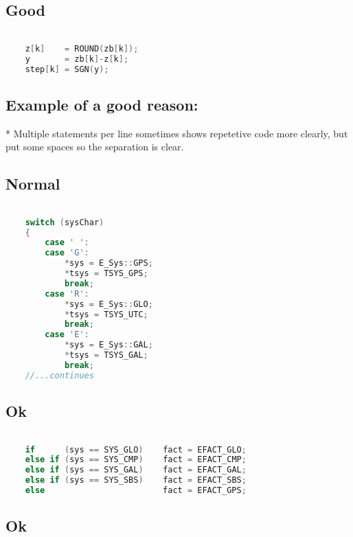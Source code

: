 \subsection{Good}

\begin{lstlisting}[language=c++]

    z[k]    = ROUND(zb[k]);
    y       = zb[k]-z[k]; 
    step[k] = SGN(y);
\end{lstlisting}

\subsection{Example of a good reason:}

* Multiple statements per line sometimes shows repetetive code more clearly, but put some spaces so the separation is clear.

\subsection{Normal}

\begin{lstlisting}[language=c++]

    switch (sysChar)
    {
        case ' ':
        case 'G': 
            *sys = E_Sys::GPS; 
            *tsys = TSYS_GPS; 
            break;
        case 'R': 
            *sys = E_Sys::GLO;  
            *tsys = TSYS_UTC; 
            break;
        case 'E': 
            *sys = E_Sys::GAL;  
            *tsys = TSYS_GAL; 
            break;
    //...continues
\end{lstlisting}

\subsection{Ok}

\begin{lstlisting}[language=c++]

    if      (sys == SYS_GLO)    fact = EFACT_GLO;
	else if (sys == SYS_CMP)    fact = EFACT_CMP;
	else if (sys == SYS_GAL)    fact = EFACT_GAL;
	else if (sys == SYS_SBS)    fact = EFACT_SBS;
	else                        fact = EFACT_GPS;
\end{lstlisting}

\subsection{Ok}	

